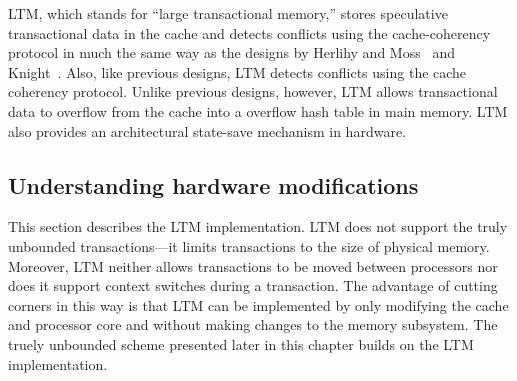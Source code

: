
LTM, which stands for ``large
transactional memory,'' stores speculative transactional data in the
cache and detects conflicts using the cache-coherency protocol in much
the same way as the designs by Herlihy and Moss~\cite{HerlihyMo92} and
Knight~\cite{Knight86,Knight89}.  Also, like previous designs, LTM
detects conflicts using the cache coherency protocol.  Unlike previous
designs, however, LTM allows transactional data to overflow from the
cache into a overflow hash table in main memory.  LTM also provides an
architectural state-save mechanism in hardware.


\subsection{Understanding hardware modifications}

This section describes the LTM implementation.  LTM does not
support the truly unbounded transactions---it limits transactions to
the size of physical memory.  Moreover,
LTM neither allows transactions to be moved between processors nor
does it support context switches during a transaction.  The advantage
of cutting corners in this way is that LTM can be implemented by only
modifying the cache and processor core and without making changes to
the memory subsystem.  The truely unbounded scheme presented later in
this chapter builds on the LTM implementation.

